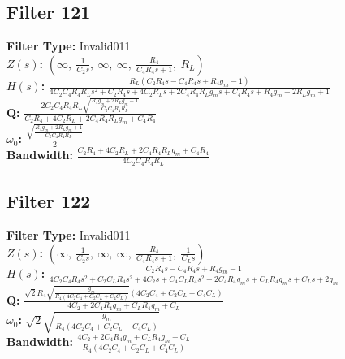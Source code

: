 \documentclass{article}
\begin{document}
\subsection*{Filter 121}
\textbf{Filter Type:} Invalid011 \\ 
\textbf{$Z(s)$:} $\left( \infty, \  \frac{1}{C_{2} s}, \  \infty, \  \infty, \  \frac{R_{4}}{C_{4} R_{4} s + 1}, \  R_{L}\right)$ \\ 
\textbf{$H(s)$:} $\frac{R_{L} \left(C_{2} R_{4} s - C_{4} R_{4} s + R_{4} g_{m} - 1\right)}{4 C_{2} C_{4} R_{4} R_{L} s^{2} + C_{2} R_{4} s + 4 C_{2} R_{L} s + 2 C_{4} R_{4} R_{L} g_{m} s + C_{4} R_{4} s + R_{4} g_{m} + 2 R_{L} g_{m} + 1}$ \\ 
\textbf{Q:} $\frac{2 C_{2} C_{4} R_{4} R_{L} \sqrt{\frac{R_{4} g_{m} + 2 R_{L} g_{m} + 1}{C_{2} C_{4} R_{4} R_{L}}}}{C_{2} R_{4} + 4 C_{2} R_{L} + 2 C_{4} R_{4} R_{L} g_{m} + C_{4} R_{4}}$ \\ 
\textbf{$\omega_0$:} $\frac{\sqrt{\frac{R_{4} g_{m} + 2 R_{L} g_{m} + 1}{C_{2} C_{4} R_{4} R_{L}}}}{2}$ \\ 
\textbf{Bandwidth:} $\frac{C_{2} R_{4} + 4 C_{2} R_{L} + 2 C_{4} R_{4} R_{L} g_{m} + C_{4} R_{4}}{4 C_{2} C_{4} R_{4} R_{L}}$ \\ 
\subsection*{Filter 122}
\textbf{Filter Type:} Invalid011 \\ 
\textbf{$Z(s)$:} $\left( \infty, \  \frac{1}{C_{2} s}, \  \infty, \  \infty, \  \frac{R_{4}}{C_{4} R_{4} s + 1}, \  \frac{1}{C_{L} s}\right)$ \\ 
\textbf{$H(s)$:} $\frac{C_{2} R_{4} s - C_{4} R_{4} s + R_{4} g_{m} - 1}{4 C_{2} C_{4} R_{4} s^{2} + C_{2} C_{L} R_{4} s^{2} + 4 C_{2} s + C_{4} C_{L} R_{4} s^{2} + 2 C_{4} R_{4} g_{m} s + C_{L} R_{4} g_{m} s + C_{L} s + 2 g_{m}}$ \\ 
\textbf{Q:} $\frac{\sqrt{2} R_{4} \sqrt{\frac{g_{m}}{R_{4} \left(4 C_{2} C_{4} + C_{2} C_{L} + C_{4} C_{L}\right)}} \left(4 C_{2} C_{4} + C_{2} C_{L} + C_{4} C_{L}\right)}{4 C_{2} + 2 C_{4} R_{4} g_{m} + C_{L} R_{4} g_{m} + C_{L}}$ \\ 
\textbf{$\omega_0$:} $\sqrt{2} \sqrt{\frac{g_{m}}{R_{4} \left(4 C_{2} C_{4} + C_{2} C_{L} + C_{4} C_{L}\right)}}$ \\ 
\textbf{Bandwidth:} $\frac{4 C_{2} + 2 C_{4} R_{4} g_{m} + C_{L} R_{4} g_{m} + C_{L}}{R_{4} \left(4 C_{2} C_{4} + C_{2} C_{L} + C_{4} C_{L}\right)}$ \\ 
\end{document}
